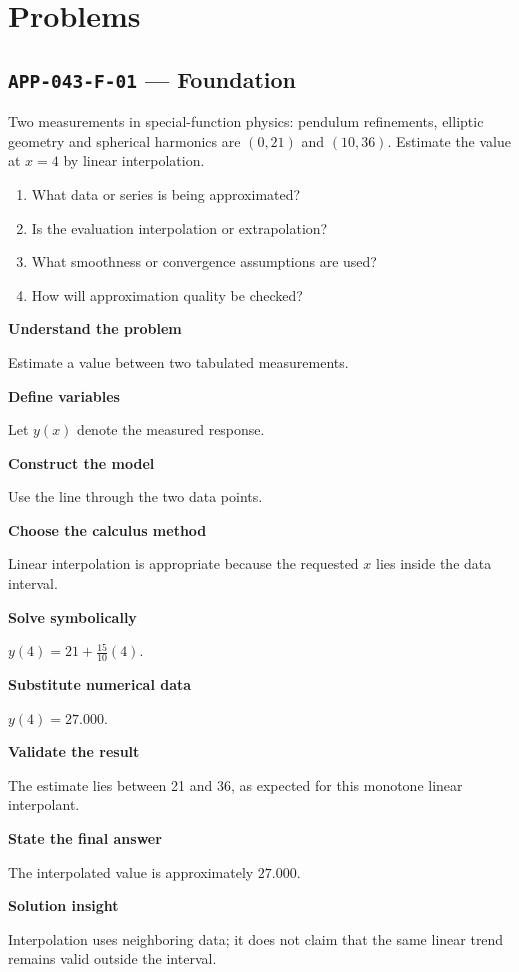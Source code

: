 \documentclass[11pt]{book}
\newcommand{\pid}[1]{\texttt{#1}}
\begin{document}
\section*{Problems}
\subsection*{\pid{APP-043-F-01} — Foundation}
\begin{problembox}
Two measurements in special-function physics: pendulum refinements, elliptic geometry and spherical harmonics are $(0,21)$ and $(10,36)$. Estimate the value at $x=4$ by linear interpolation.
\end{problembox}
\begin{promptbox}\begin{enumerate}
\item What data or series is being approximated?
\item Is the evaluation interpolation or extrapolation?
\item What smoothness or convergence assumptions are used?
\item How will approximation quality be checked?
\end{enumerate}\end{promptbox}
\begin{solutionbox}
\textbf{Understand the problem}\par Estimate a value between two tabulated measurements.\par\medskip
\textbf{Define variables}\par Let $y(x)$ denote the measured response.\par\medskip
\textbf{Construct the model}\par Use the line through the two data points.\par\medskip
\textbf{Choose the calculus method}\par Linear interpolation is appropriate because the requested $x$ lies inside the data interval.\par\medskip
\textbf{Solve symbolically}\par $y(4)=21+\frac{15}{10}(4)$.\par\medskip
\textbf{Substitute numerical data}\par $y(4)=27.000$.\par\medskip
\textbf{Validate the result}\par The estimate lies between 21 and 36, as expected for this monotone linear interpolant.\par\medskip
\textbf{State the final answer}\par The interpolated value is approximately $27.000$.\par\medskip
\textbf{Solution insight}\par Interpolation uses neighboring data; it does not claim that the same linear trend remains valid outside the interval.\par\medskip
\end{solutionbox}
\end{document}
